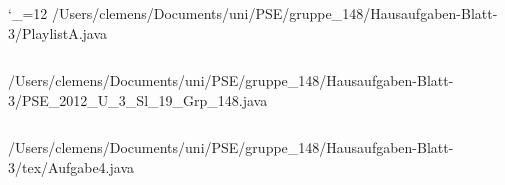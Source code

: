 \begingroup
\catcode`\_=12\relax
/Users/clemens/Documents/uni/PSE/gruppe_148/Hausaufgaben-Blatt-3/PlaylistA.java
\inputminted{java}{/Users/clemens/Documents/uni/PSE/gruppe_148/Hausaufgaben-Blatt-3/PlaylistA.java}
/Users/clemens/Documents/uni/PSE/gruppe_148/Hausaufgaben-Blatt-3/PSE_2012_U_3_Sl_19_Grp_148.java
\inputminted{java}{/Users/clemens/Documents/uni/PSE/gruppe_148/Hausaufgaben-Blatt-3/PSE_2012_U_3_Sl_19_Grp_148.java}
/Users/clemens/Documents/uni/PSE/gruppe_148/Hausaufgaben-Blatt-3/tex/Aufgabe4.java
\inputminted{java}{/Users/clemens/Documents/uni/PSE/gruppe_148/Hausaufgaben-Blatt-3/tex/Aufgabe4.java}
\endgroup
